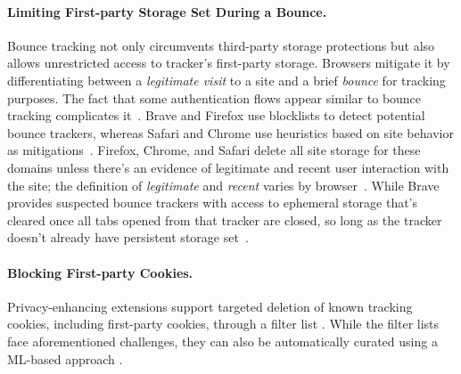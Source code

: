 
\paragraph{Limiting First-party Storage Set During a Bounce.}
%
Bounce tracking not only circumvents third-party storage protections but also allows unrestricted access to tracker’s first-party storage. 
%
Browsers mitigate it by differentiating between a \textit{legitimate visit} to a site and a brief \textit{bounce} for tracking purposes. 
%
The fact that some authentication flows appear similar to bounce tracking complicates it~\cite{kellyBounceTrackingMitigations2022}. 
%
Brave and Firefox use blocklists to detect potential bounce trackers, whereas Safari and Chrome use heuristics based on site behavior as mitigations~\cite{snyderNavigationalTrackingMitigations2024}. 
%
Firefox, Chrome, and Safari delete all site storage for these domains unless there's an evidence of legitimate and recent user interaction with the site; the definition of \textit{legitimate} and \textit{recent} varies by browser~\cite{snyderNavigationalTrackingMitigations2024,TrackingPreventionWebKit2020}. 
%
While Brave provides suspected bounce trackers with access to ephemeral storage that’s cleared once all tabs opened from that tracker are closed, so long as the tracker doesn’t already have persistent storage set~\cite{braveprivacyteamUnlinkableBouncingMore2022}.


\paragraph{Blocking First-party Cookies.}
Privacy-enhancing extensions support targeted deletion of known tracking cookies, including first-party cookies, through a filter list \cite{ublockResourcesLibrary,adguardrteamScriptletsWikiAboutscriptletsmd,schininaSourceBehavioralCookieremoverjs2024}.
%
While the filter lists face aforementioned challenges, they can also be automatically curated using a ML-based approach \cite{munirCookieGraphUnderstandingDetecting2023,bollingerAutomatingCookieConsent2022,schoniBlockCookiesNot2024a}.